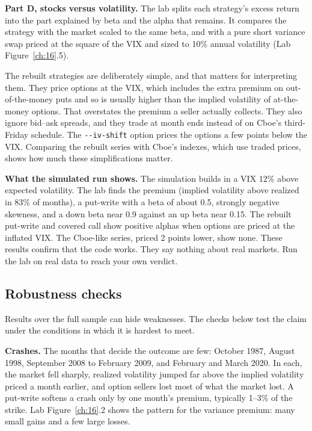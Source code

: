 \textbf{Part D, stocks versus volatility.} The lab splits each strategy's excess return into the part explained by beta and the alpha that remains. It compares the strategy with the market scaled to the same beta, and with a pure short variance swap priced at the square of the VIX and sized to 10\% annual volatility (Lab Figure~\ref{ch:16}.5).

The rebuilt strategies are deliberately simple, and that matters for interpreting them. They price options at the VIX, which includes the extra premium on out-of-the-money puts and so is usually higher than the implied volatility of at-the-money options. That overstates the premium a seller actually collects. They also ignore bid--ask spreads, and they trade at month ends instead of on Cboe's third-Friday schedule. The \texttt{-{}-iv-shift} option prices the options a few points below the VIX. Comparing the rebuilt series with Cboe's indexes, which use traded prices, shows how much these simplifications matter.

\textbf{What the simulated run shows.} The simulation builds in a VIX 12\% above expected volatility. The lab finds the premium (implied volatility above realized in 83\% of months), a put-write with a beta of about 0.5, strongly negative skewness, and a down beta near 0.9 against an up beta near 0.15. The rebuilt put-write and covered call show positive alphas when options are priced at the inflated VIX. The Cboe-like series, priced 2 points lower, show none. These results confirm that the code works. They say nothing about real markets. Run the lab on real data to reach your own verdict.

\subsection{Robustness checks}
\label{sec:16-stress}

Results over the full sample can hide weaknesses. The checks below test the claim under the conditions in which it is hardest to meet.

\textbf{Crashes.} The months that decide the outcome are few: October 1987, August 1998, September 2008 to February 2009, and February and March 2020. In each, the market fell sharply, realized volatility jumped far above the implied volatility priced a month earlier, and option sellers lost most of what the market lost. A put-write softens a crash only by one month's premium, typically 1--3\% of the strike. Lab Figure~\ref{ch:16}.2 shows the pattern for the variance premium: many small gains and a few large losses.

